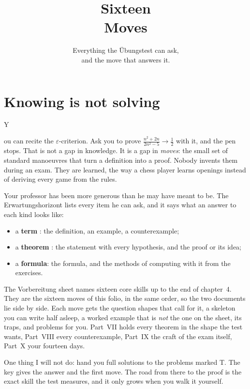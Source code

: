 \documentclass{kaelearn}
\title{Sixteen\\Moves}
\subtitle{Everything the Übungstest can ask,\\and the move that answers it.}
\newcommand\eps{\varepsilon}
\begin{document}
\makecover

\section{Knowing is not solving}

\opening{Y}{ou can recite} the $\eps$-criterion. Ask you to prove $\frac{n^2+2n}{2n^2-5}\to\frac12$ with it, and the pen
stops. That is not a gap in knowledge. It is a gap in \emph{moves}: the small set of standard manoeuvres that turn a definition
into a proof. Nobody invents them during an exam. They are learned, the way a chess player learns openings instead of deriving
every game from the rules.

Your professor has been more generous than he may have meant to be. The Erwartungshorizont lists every item he can ask, and
it says what an answer to each kind looks like:
\begin{itemize}
  \item a \textbf{term} : the definition, an example, a counterexample;
  \item a \textbf{theorem} : the statement with every hypothesis, and the proof or its idea;
  \item a \textbf{formula}: the formula, and the methods of computing with it from the exercises.
\end{itemize}
The Vorbereitung sheet names sixteen core skills  up to the end of chapter~4. They are the sixteen moves
of this folio, in the same order, so the two documents lie side by side. Each move gets the question shapes that call for it,
a skeleton you can write half asleep, a worked example that is \emph{not} the one on the sheet, its traps, and problems for
you. Part~VII holds every theorem in the shape the test wants, Part~VIII every counterexample, Part~IX the craft of the exam
itself, Part~X your fourteen days.

One thing I will not do: hand you full solutions to the problems marked T. The key gives the answer and the first move. The
road from there to the proof is the exact skill the test measures, and it only grows when you walk it yourself.
\end{document}

